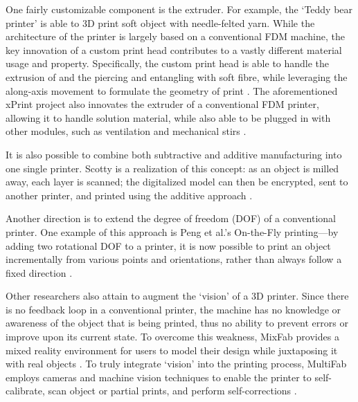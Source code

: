 One fairly customizable component is the extruder. For example, the `Teddy bear printer' is able to 3D print soft object with needle-felted yarn. While the architecture of the printer is largely based on a conventional FDM machine, the key innovation of a custom print head contributes to a vastly different material usage and property. Specifically, the custom print head is able to handle the extrusion of and the piercing and entangling with soft fibre, while leveraging the along-axis movement to formulate the geometry of print \cite{hudson2014printing}. The aforementioned xPrint project also innovates the extruder of a conventional FDM printer, allowing it to handle solution material, while also able to be plugged in with other modules, such as ventilation and mechanical stirs \cite{wang2016xprint}.

It is also possible to combine both subtractive and additive manufacturing into one single printer. Scotty is a realization of this concept: as an object is milled away, each layer is scanned; the digitalized model can then be encrypted, sent to another printer, and printed using the additive approach \cite{mueller2015scotty}.

Another direction is to extend the degree of freedom (DOF) of a conventional printer. One example of this approach is Peng et al.'s On-the-Fly printing---by adding two rotational DOF to a printer, it is now possible to print an object incrementally from various points and orientations, rather than always follow a fixed direction \cite{peng2016fly}.

Other researchers also attain to augment the `vision' of a 3D printer. Since there is no feedback loop in a conventional printer, the machine has no knowledge or awareness of the object that is being printed, thus no ability to prevent errors or improve upon its current state. To overcome this weakness, MixFab provides a mixed reality environment for users to model their design while juxtaposing it with real objects \cite{weichel2014mixfab}. To truly integrate `vision' into the printing process, MultiFab employs cameras and machine vision techniques to enable the printer to self-calibrate, scan object or partial prints, and perform self-corrections \cite{sitthi2015multifab}.


